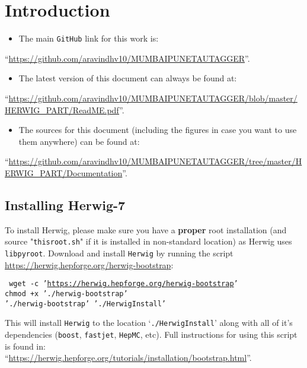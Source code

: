 \section{Introduction}

\begin{itemize}
\item The main {\tt GitHub} link for this work is:
\end{itemize}
\begin{flushleft}
    ``\small{\url{https://github.com/aravindhv10/MUMBAIPUNETAUTAGGER}}''.
\end{flushleft}

\begin{itemize}
    \item The latest version of this document can always be found at:
\end{itemize}
\begin{flushleft}
    ``\small{\url{https://github.com/aravindhv10/MUMBAIPUNETAUTAGGER/blob/master/HERWIG_PART/ReadME.pdf}}''.
\end{flushleft}

\begin{itemize}
    \item The sources for this document (including the figures in case you want to use them anywhere) can be found at:
\end{itemize}
\begin{flushleft}
    ``\small{\url{https://github.com/aravindhv10/MUMBAIPUNETAUTAGGER/tree/master/HERWIG_PART/Documentation}}''.
\end{flushleft}

\subsection{Installing Herwig-7}
To install Herwig, please make sure you have a {\bf proper} root installation (and source "{\tt thisroot.sh}" if it is installed in non-standard location) as Herwig uses {\tt libpyroot}.
Download and install {\tt Herwig} by running the script \url{https://herwig.hepforge.org/herwig-bootstrap}:
\begin{center}
    \begin{minipage}{0.7\textwidth}
        {\tt
            wget -c '\url{https://herwig.hepforge.org/herwig-bootstrap}'\\
            chmod +x './herwig-bootstrap'\\
            './herwig-bootstrap' './HerwigInstall'
        }
    \end{minipage}
\end{center}
This will install {\tt Herwig} to the location `{\tt ./HerwigInstall}' along with all of it's dependencies ({\tt boost}, {\tt fastjet}, {\tt HepMC}, etc).
Full instructions for using this script is found in:\\
``\small{\url{https://herwig.hepforge.org/tutorials/installation/bootstrap.html}}''.

